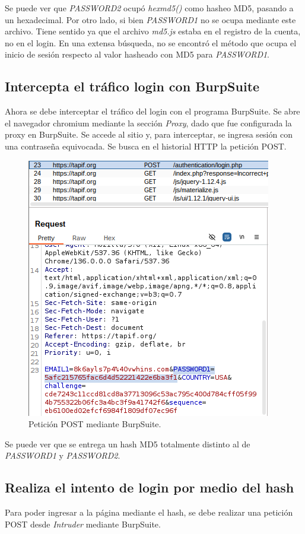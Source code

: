 \documentclass[letter,12pt]{article}
\begin{document}
Se puede ver que \textit{PASSWORD2} ocupó \textit{hex\textunderscore md5()} como hasheo MD5, pasando a un hexadecimal. Por otro lado, si bien \textit{PASSWORD1} no se ocupa mediante este archivo. Tiene sentido ya que el archivo \textit{md5.js} estaba en el registro de la cuenta, no en el login. En una extensa búsqueda, no se encontró el método que ocupa el inicio de sesión respecto al valor hasheado con MD5 para \textit{PASSWORD1}.

\subsection{Intercepta el tráfico login con BurpSuite}

Ahora se debe interceptar el tráfico del login con el programa BurpSuite. Se abre el navegador chromium mediante la sección \textit{Proxy}, dado que fue configurada la proxy en BurpSuite. Se accede al sitio y, para interceptar, se ingresa sesión con una contraseña equivocada. Se busca en el historial HTTP la petición POST. 

\begin{figure}[H]
            \centering
            \includegraphics[width=0.5\linewidth]{intercept.png}
        \caption{\label{fig:10} Petición POST mediante BurpSuite. }
    \end{figure}

Se puede ver que se entrega un hash MD5 totalmente distinto al de \textit{PASSWORD1} y \textit{PASSWORD2}.

\subsection{Realiza el intento de login por medio del hash}

Para poder ingresar a la página mediante el hash, se debe realizar una petición POST desde \textit{Intruder} mediante BurpSuite.
\end{document}
